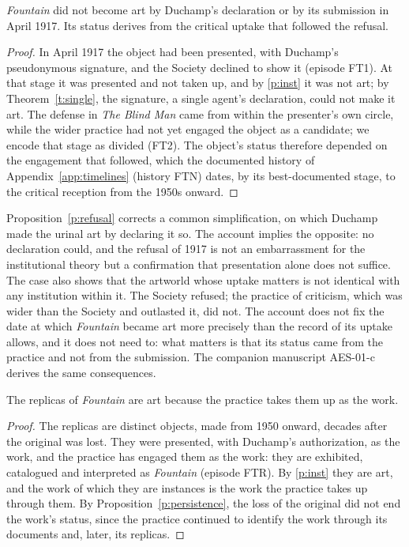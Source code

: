 \documentclass{situationist-preprint}
\begin{document}
\begin{proposition}\label{p:refusal}
\emph{Fountain} did not become art by Duchamp's declaration or by its submission in April 1917. Its status derives from the critical uptake that followed the refusal.
\end{proposition}

\begin{proof}
In April 1917 the object had been presented, with Duchamp's pseudonymous signature, and the Society declined to show it (episode FT1). At that stage it was presented and not taken up, and by \ref{p:inst} it was not art; by Theorem~\ref{t:single}, the signature, a single agent's declaration, could not make it art. The defense in \emph{The Blind Man} came from within the presenter's own circle, while the wider practice had not yet engaged the object as a candidate; we encode that stage as divided (FT2). The object's status therefore depended on the engagement that followed, which the documented history of Appendix~\ref{app:timelines} (history FTN) dates, by its best-documented stage, to the critical reception from the 1950s onward.
\end{proof}

Proposition~\ref{p:refusal} corrects a common simplification, on which Duchamp made the urinal art by declaring it so. The account implies the opposite: no declaration could, and the refusal of 1917 is not an embarrassment for the institutional theory but a confirmation that presentation alone does not suffice. The case also shows that the artworld whose uptake matters is not identical with any institution within it. The Society refused; the practice of criticism, which was wider than the Society and outlasted it, did not. The account does not fix the date at which \emph{Fountain} became art more precisely than the record of its uptake allows, and it does not need to: what matters is that its status came from the practice and not from the submission. The companion manuscript AES-01-c derives the same consequences.

\begin{proposition}\label{p:replicas}
The replicas of \emph{Fountain} are art because the practice takes them up as the work.
\end{proposition}

\begin{proof}
The replicas are distinct objects, made from 1950 onward, decades after the original was lost. They were presented, with Duchamp's authorization, as the work, and the practice has engaged them as the work: they are exhibited, catalogued and interpreted as \emph{Fountain} (episode FTR). By \ref{p:inst} they are art, and the work of which they are instances is the work the practice takes up through them. By Proposition~\ref{p:persistence}, the loss of the original did not end the work's status, since the practice continued to identify the work through its documents and, later, its replicas.
\end{proof}
\end{document}
